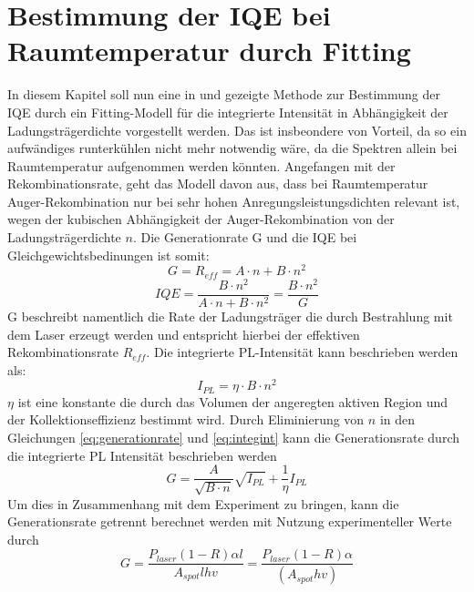 
\section{Bestimmung der IQE bei Raumtemperatur durch Fitting}

\thispagestyle{fancy}

In diesem Kapitel soll nun eine in \cite{doi:10.1063/1.3100773} und \cite{doi:10.1063/1.4917540} gezeigte Methode zur Bestimmung der IQE durch ein Fitting-Modell für die integrierte Intensität in Abhängigkeit der Ladungsträgerdichte vorgestellt werden. Das ist insbeondere von Vorteil, da so ein aufwändiges runterkühlen nicht mehr notwendig wäre, da die Spektren allein bei Raumtemperatur aufgenommen werden könnten. 
\newline
Angefangen mit der Rekombinationsrate, geht das Modell davon aus,
dass bei Raumtemperatur Auger-Rekombination nur bei sehr hohen Anregungsleistungsdichten relevant ist, wegen der kubischen Abhängigkeit der Auger-Rekombination von der Ladungsträgerdichte $n$. Die Generationrate G und die IQE bei Gleichgewichtsbedinungen ist somit:
\begin{equation}
    G = R_{eff} = A \cdot n + B \cdot n^2
    \label{eq:generationrate}
\end{equation}  
\begin{equation}
    IQE = \frac{B\cdot n^2}{A \cdot n + B \cdot n^2} = \frac{B\cdot n^2}{G}
    \label{eq:iqe2}
\end{equation}  
G beschreibt namentlich die Rate der Ladungsträger die durch Bestrahlung mit dem Laser erzeugt werden und entspricht hierbei der effektiven Rekombinationsrate $R_{eff}$.
Die integrierte PL-Intensität kann beschrieben werden als:
\begin{equation}
    I_{PL} = \eta \cdot B \cdot n^2
    \label{eq:integint}
\end{equation} 
$\eta$ ist eine konstante die durch das Volumen der angeregten aktiven Region und der Kollektionseffizienz bestimmt wird. Durch Eliminierung von $n$ in den Gleichungen \ref{eq:generationrate} und \ref{eq:integint} kann die Generationsrate durch die integrierte PL Intensität beschrieben werden
\begin{equation}
    G = \frac{A}{\sqrt{B\cdot n}}\sqrt{I_{PL}} + \frac{1}{\eta} I_{PL}
\end{equation} 
Um dies in Zusammenhang mit dem Experiment zu bringen, kann die Generationsrate getrennt berechnet werden mit Nutzung experimenteller Werte durch 
\begin{equation}
    G = \frac{P_{laser} (1-R)\alpha l}{A_{spot} l h v} = \frac{P_{laser}(1-R) \alpha }{ (A_{spot} h v)}
\end{equation} 
